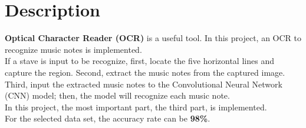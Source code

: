 \chapter{Description}
\indent\indent
	\textbf{Optical Character Reader (OCR)} is a useful tool. In this project, an OCR to recognize music notes is implemented. \\
	If a stave is input to be recognize, first, locate the five horizontal lines and capture the region. Second, extract the music notes from the captured image. 
	Third, input the extracted music notes to the Convolutional Neural Network (CNN) model; then, the model will recognize each music note. \\
	In this project, the most important part, the third part, is implemented. \\
	For the selected data set, the accuracy rate can be \textbf{98\%}.

